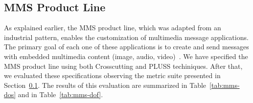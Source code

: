 \documentclass{acm_proc_article-sp}
\begin{document}
% 
% 
%  

\subsection{MMS Product Line}

As explained earlier, the MMS product line, which was adapted from an industrial
pattern, enables the customization of multimedia message applications. The
primary goal of each one of these applications is to create and send messages
with embedded multimedia content (image, audio, video)~\cite{Bonifacio:2008aa}.
We have specified the MMS product line using both Crosscutting and PLUSS
techiniques. After that, we evaluated these specifications observing the metric
suite presented in Section~\ref{}. The results of this evaluation are summarized
in Table~\ref{tab:mms-dos} and in Table~\ref{tab:mms-dof}.
\end{document}
